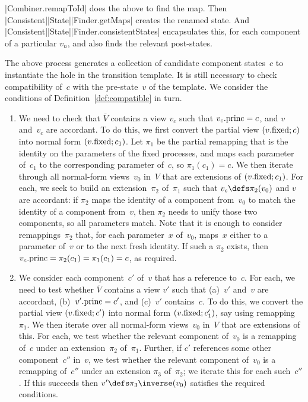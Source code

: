 
\begin{impNote}
|Combiner.remapToId| does the above to find the map.  Then
|Consistent|\-|State|\-|Finder.getMaps| creates the renamed state.
And |Consistent|\-|State|\-|Finder.consistentStates| encapsulates this, for each
component of a particular $v_n$, and also finds the relevant post-states.
\end{impNote}


The above process generates a collection of candidate component states~$c$ to
instantiate the hole in the transition template.  It is still necessary to
check compatibility of~$c$ with the pre-state~$v$ of the template.  We
consider the conditions of Definition~\ref{def:compatible} in turn.
%
\begin{enumerate}
\item We need to check that $\overline{V}$ contains a view $v_c$ such that
  $v_c.\mathrm{princ} = c$, and $v$ and~$v_c$ are accordant.  To do this, we first
  convert the partial view $(v.\mathrm{fixed}; c)$ into normal form $(v.\mathrm{fixed}; c_1)$.
  Let $\pi_1$ be the partial remapping that is the identity on the parameters
  of the fixed processes, and maps each parameter of~$c_1$ to the
  corresponding parameter of~$c$, so $\pi_1(c_1) = c$.  We then iterate
  through all normal-form views~$v_0$ in~$V$ that are extensions of
  $(v.\mathrm{fixed}; c_1)$.  For each, we seek to build an extension~$\pi_2$
  of~$\pi_1$ such that $v_c \defs \pi_2(v_0)$ and $v$ are accordant: if
  $\pi_2$ maps the identity of a component from~$v_0$ to match the identity of
  a component from~$v$, then $\pi_2$ needs to unify those two components, so
  all parameters match.  Note that it is enough to consider remappings~$\pi_2$
  that, for each parameter~$x$ of~$v_0$, maps~$x$ either to a parameter of~$v$
  or to the next fresh identity.  If such a $\pi_2$ exists, then $v_c.\mathrm{princ} =
  \pi_2(c_1) = \pi_1(c_1) = c$, as required.

\item We consider each component~$c'$ of~$v$ that has a reference to~$c$.  For
  each, we need to test whether $\overline{V}$ contains a view $v'$ such that
  (a)~$v'$ and~$v$ are accordant, (b)~$v'.\mathrm{princ} = c'$, and (c)~$v'$
  contains~$c$.  To do this, we convert the partial view $(v.\mathrm{fixed}; c')$ into
  normal form $(v.\mathrm{fixed}; c_1')$, say using remapping~$\pi_1$.  We then
  iterate over all normal-form views~$v_0$ in~$V$ that are extensions of this.
  For each, we test whether the relevant component of~$v_0$ is a remapping
  of~$c$ under an extension~$\pi_2$ of~$\pi_1$.  Further, if $c'$ references
  some other component~$c''$ in~$v$, we test whether the relevant component
  of~$v_0$ is a remapping of~$c''$ under an extension $\pi_3$ of~$\pi_2$; we
  iterate this for each such~$c''$.  If this succeeds then $v' \defs
  \pi_3\inverse(v_0)$ satisfies the required conditions.
\end{enumerate}

